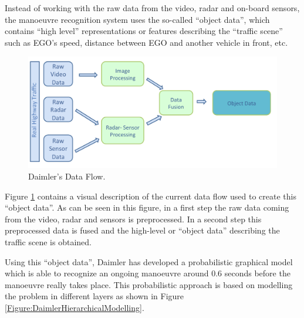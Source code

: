 Instead of working with the raw data from the video, radar and on-board sensors, the manoeuvre recognition system uses the so-called ``object data'', which contains ``high level'' representations or features describing the ``traffic scene'' such as EGO's speed, distance between EGO and another vehicle in front, etc.  
\begin{figure}
\begin{center}
\includegraphics[scale=0.35]{./figures/DaimlerDataFlow}
\caption{\label{Figure:DaimlerDataFlow} Daimler's Data Flow.}
\end{center}
\end{figure}

Figure \ref{Figure:DaimlerDataFlow} contains a visual description of the current data flow used to create this ``object data''.  As can be seen in this figure, in a first step the raw data coming from the video, radar and sensors is preprocessed. In a second step this preprocessed data is fused and the high-level or ``object data'' describing the traffic scene is obtained. 

Using this ``object data'', Daimler has developed a probabilistic graphical model \cite{kasper2012object} which is able to recognize an ongoing manoeuvre around 0.6 seconds before the manoeuvre really takes place. This probabilistic approach is based on modelling the problem in different layers as shown in Figure \ref{Figure:DaimlerHierarchicalModelling}.



